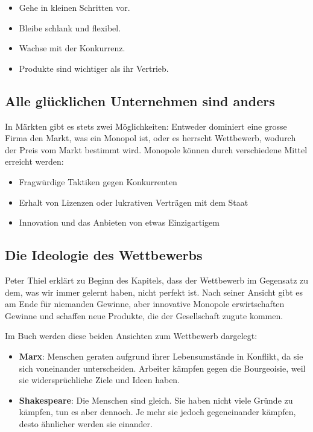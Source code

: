 \documentclass[10pt]{article}
\begin{document}
\begin{itemize}
\item Gehe in kleinen Schritten vor.
\item Bleibe schlank und flexibel.
\item Wachse mit der Konkurrenz.
\item Produkte sind wichtiger als ihr Vertrieb.
\end{itemize}

\subsection{Alle glücklichen Unternehmen sind anders}

In Märkten gibt es stets zwei Möglichkeiten: Entweder dominiert eine grosse Firma den Markt, was ein Monopol ist, oder es herrscht Wettbewerb, wodurch der Preis vom Markt bestimmt wird. Monopole können durch verschiedene Mittel erreicht werden:

\begin{itemize}
\item Fragwürdige Taktiken gegen Konkurrenten
\item Erhalt von Lizenzen oder lukrativen Verträgen mit dem Staat
\item Innovation und das Anbieten von etwas Einzigartigem
\end{itemize}

\subsection{Die Ideologie des Wettbewerbs}

Peter Thiel erklärt zu Beginn des Kapitels, dass der Wettbewerb im Gegensatz zu dem, was wir immer gelernt haben, nicht perfekt ist. Nach seiner Ansicht gibt es am Ende für niemanden Gewinne, aber innovative Monopole erwirtschaften Gewinne und schaffen neue Produkte, die der Gesellschaft zugute kommen.

Im Buch werden diese beiden Ansichten zum Wettbewerb dargelegt:

\begin{itemize}
\item \textbf{Marx}: Menschen geraten aufgrund ihrer Lebensumstände in Konflikt, da sie sich voneinander unterscheiden. Arbeiter kämpfen gegen die Bourgeoisie, weil sie widersprüchliche Ziele und Ideen haben.
\item \textbf{Shakespeare}: Die Menschen sind gleich. Sie haben nicht viele Gründe zu kämpfen, tun es aber dennoch. Je mehr sie jedoch gegeneinander kämpfen, desto ähnlicher werden sie einander.
\end{itemize}
\end{document}

